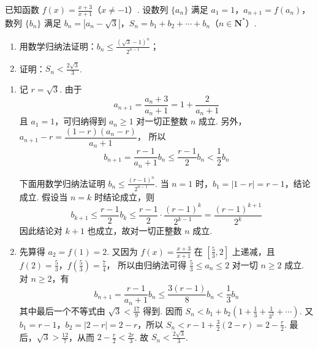 \begin{problem}
已知函数 \(f(x) = \frac{x+3}{x+1}\)（\(x \ne -1\)）. 设数列 \(\{a_n\}\) 满足 \(a_1 = 1\)，\(a_{n+1} = f(a_n)\)，数列 \(\{b_n\}\) 满足 \(b_n = |a_n - \sqrt{3}|\)，\(S_n = b_1 + b_2 + \cdots + b_n\)（\(n \in \mathbf{N}^*\)）.

\begin{enumerate}
\item 用数学归纳法证明：\(b_n \leqslant \frac{(\sqrt{3} - 1)^n}{2^{n-1}}\)；
\item 证明：\(S_n < \frac{2\sqrt{3}}{3}\).
\end{enumerate}

\begin{solution}
\begin{enumerate}
\item 记 \(r=\sqrt3\). 由于
\[
a_{n+1}=\frac{a_n+3}{a_n+1}=1+\frac2{a_n+1}
\]
且 \(a_1=1\)，可归纳得到 \(a_n\geqslant1\) 对一切正整数 \(n\) 成立. 另外，
\(a_{n+1}-r=\dfrac{(1-r)(a_n-r)}{a_n+1}\)，
所以
\[
b_{n+1}=\frac{r-1}{a_n+1}b_n\leqslant\frac{r-1}{2}b_n<\frac12b_n
\]

下面用数学归纳法证明 \(b_n\leqslant\frac{(r-1)^n}{2^{n-1}}\). 当 \(n=1\) 时，\(b_1=|1-r|=r-1\)，结论成立. 假设当 \(n=k\) 时结论成立，则
\[
b_{k+1}\leqslant\frac{r-1}{2}b_k\leqslant\frac{r-1}{2}\cdot\frac{(r-1)^k}{2^{k-1}}=\frac{(r-1)^{k+1}}{2^k}
\]
因此结论对 \(k+1\) 也成立，故对一切正整数 \(n\) 成立.

\item 先算得 \(a_2=f(1)=2\). 又因为 \(f(x)=\frac{x+3}{x+1}\) 在 \([\frac53,2]\) 上递减，且
\(f(2)=\frac53\)，\(f\left(\frac53\right)=\frac74\)，
所以由归纳法可得 \(\frac53\leqslant a_n\leqslant2\) 对一切 \(n\geqslant2\) 成立. 对 \(n\geqslant2\)，有
\[
b_{n+1}=\frac{r-1}{a_n+1}b_n\leqslant\frac{3(r-1)}8b_n<\frac13b_n
\]
其中最后一个不等式由 \(\sqrt3<\frac{17}{9}\) 得到. 因而
\(S_n<b_1+b_2\left(1+\frac13+\frac1{3^2}+\cdots\right)\).
又 \(b_1=r-1\)，\(b_2=|2-r|=2-r\)，所以
\(S_n<r-1+\frac32(2-r)=2-\frac r2\).
最后，\(\sqrt3>\frac{12}{7}\)，从而
\(2-\frac r2<\frac{2r}{3}\).
故 \(S_n<\frac{2\sqrt3}{3}\).
\end{enumerate}
\end{solution}
\end{problem}

